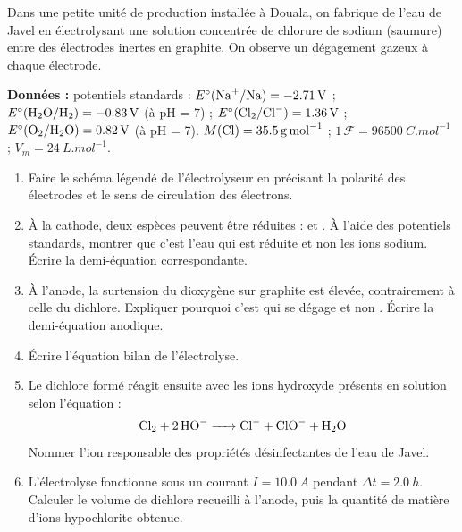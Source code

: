 \documentclass[11pt]{article}
\newcounter{popsec}
\newcounter{popsub}
\newcommand{\courssub}[1]{%
  \stepcounter{popsub}%
  \par\vspace{9pt}\noindent{\popxbold\fontsize{11.5}{13}\selectfont\color{popink}{\color{poporange}\thepopsec.\thepopsub}\hspace{6pt}#1}\par\nopagebreak\vspace{4pt}
}
\begin{document}
\courssub{Je me prépare au Probatoire}

\begin{exercice}
Dans une petite unité de production installée à Douala, on fabrique de l'eau de Javel en électrolysant une solution concentrée de chlorure de sodium (saumure) entre des électrodes inertes en graphite. On observe un dégagement gazeux à chaque électrode.

\textbf{Données :} potentiels standards : $E^\circ(\ce{Na+}/\ce{Na}) = \SI{-2,71}{V}$ ; $E^\circ(\ce{H2O}/\ce{H2}) = \SI{-0,83}{V}$ (à pH = 7) ; $E^\circ(\ce{Cl2}/\ce{Cl-}) = \SI{1,36}{V}$ ; $E^\circ(\ce{O2}/\ce{H2O}) = \SI{0,82}{V}$ (à pH = 7). $M(\ce{Cl}) = \SI{35,5}{g.mol^{-1}}$ ; $1\,\mathcal{F} = \SI{96500}{C.mol^{-1}}$ ; $V_m = \SI{24}{L.mol^{-1}}$.

\begin{enumerate}
\item Faire le schéma légendé de l'électrolyseur en précisant la polarité des électrodes et le sens de circulation des électrons.
\item À la cathode, deux espèces peuvent être réduites :  et . À l'aide des potentiels standards, montrer que c'est l'eau qui est réduite et non les ions sodium. Écrire la demi-équation correspondante.
\item À l'anode, la surtension du dioxygène sur graphite est élevée, contrairement à celle du dichlore. Expliquer pourquoi c'est  qui se dégage et non . Écrire la demi-équation anodique.
\item Écrire l'équation bilan de l'électrolyse.
\item Le dichlore formé réagit ensuite avec les ions hydroxyde présents en solution selon l'équation :
\[ \ce{Cl2 + 2 HO- -> Cl- + ClO- + H2O} \]
Nommer l'ion responsable des propriétés désinfectantes de l'eau de Javel.
\item L'électrolyse fonctionne sous un courant $I = \SI{10,0}{A}$ pendant $\Delta t = \SI{2,0}{h}$. Calculer le volume de dichlore recueilli à l'anode, puis la quantité de matière d'ions hypochlorite  obtenue.
\end{enumerate}
\end{exercice}
\end{document}
